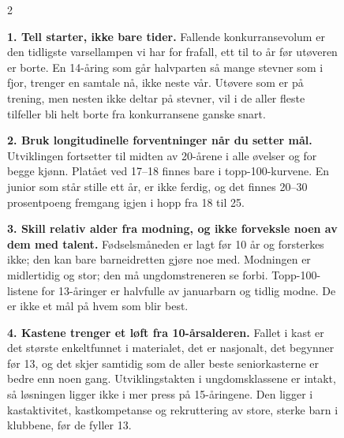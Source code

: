 \begin{figure}[t]
\begin{raadboks}
\begin{multicols}{2}

\textbf{1. Tell starter, ikke bare tider.} Fallende konkurransevolum er den
tidligste varsellampen vi har for frafall, ett til to år før utøveren er
borte. En 14-åring som går halvparten så mange stevner som i fjor, trenger en
samtale nå, ikke neste vår. Utøvere som er på trening, men nesten ikke deltar på stevner, vil i de aller fleste tilfeller bli helt borte fra konkurransene ganske snart.

\textbf{2. Bruk longitudinelle forventninger når du setter mål.} Utviklingen
fortsetter til midten av 20-årene i alle øvelser og for begge kjønn. Platået
ved 17--18 finnes bare i topp-100-kurvene. En junior som står stille ett år,
er ikke ferdig, og det finnes 20--30 prosentpoeng fremgang igjen i hopp fra 18
til 25.

\textbf{3. Skill relativ alder fra modning, og ikke forveksle noen av dem med
talent.} Fødselsmåneden er lagt før 10 år og forsterkes ikke; den kan bare
barneidretten gjøre noe med. Modningen er midlertidig og stor; den må
ungdomstreneren se forbi. Topp-100-listene for 13-åringer er halvfulle av
januarbarn og tidlig modne. De er ikke et mål på hvem som blir best.

\textbf{4. Kastene trenger et løft fra 10-årsalderen.} Fallet i kast er det
største enkeltfunnet i materialet, det er nasjonalt, det begynner før 13, og
det skjer samtidig som de aller beste seniorkasterne er bedre enn noen gang. Utviklingstakten
i ungdomsklassene er intakt, så løsningen ligger ikke i mer press på
15-åringene. Den ligger i kastaktivitet, kastkompetanse og rekruttering av
store, sterke barn i klubbene, før de fyller 13.

\end{multicols}
\end{raadboks}
\end{figure}

